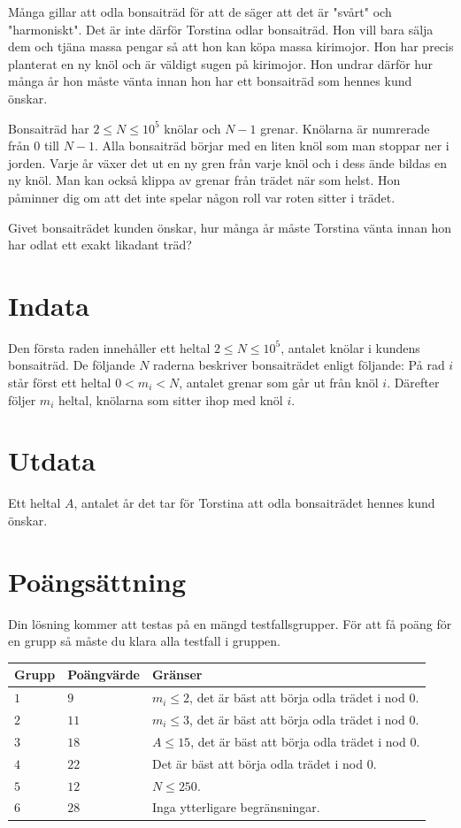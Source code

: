 Många gillar att odla bonsaiträd för att de säger att det är "svårt" och "harmoniskt". Det är inte därför Torstina odlar bonsaiträd. Hon vill bara sälja dem och tjäna massa pengar så att hon kan köpa massa kirimojor. Hon har precis planterat en ny knöl och är väldigt sugen på kirimojor. Hon undrar därför hur många år hon måste vänta innan hon har ett bonsaiträd som hennes kund önskar.

Bonsaiträd har $2\leq N \leq 10^5$ knölar och $N-1$ grenar. Knölarna är numrerade från 0 till $N-1$. Alla bonsaiträd börjar med en liten knöl som man stoppar ner i jorden. Varje år växer det ut en ny gren från varje knöl och i dess ände bildas en ny knöl. Man kan också klippa av grenar från trädet när som helst. Hon påminner dig om att det inte spelar någon roll var roten sitter i trädet. 

Givet bonsaiträdet kunden önskar, hur många år måste Torstina vänta innan hon har odlat ett exakt likadant träd?

\section*{Indata}
Den första raden innehåller ett heltal $2 \leq N \leq 10^5$, antalet knölar i kundens bonsaiträd.
De följande $N$ raderna beskriver bonsaiträdet enligt följande:
På rad $i$ står först ett heltal $0 < m_i < N$, antalet grenar som går ut från knöl $i$. Därefter följer $m_i$ heltal, knölarna som sitter ihop med knöl $i$. 

\section*{Utdata}
Ett heltal $A$, antalet år det tar för Torstina att odla bonsaiträdet hennes kund önskar.

\section*{Poängsättning}
Din lösning kommer att testas på en mängd testfallsgrupper.
För att få poäng för en grupp så måste du klara alla testfall i gruppen.

\noindent
\begin{tabular}{| l | l | p{12cm} |}
  \hline
  Grupp & Poängvärde & Gränser \\ \hline
  $1$   & $9$        & $m_i\leq 2$, det är bäst att börja odla trädet i nod 0. \\ \hline
  $2$   & $11$       & $m_i \leq 3$, det är bäst att börja odla trädet i nod 0. \\ \hline
  $3$   & $18$       & $A \leq 15$, det är bäst att börja odla trädet i nod 0. \\ \hline
  $4$   & $22$       & Det är bäst att börja odla trädet i nod 0. \\ \hline
  $5$   & $12$       & $N \leq 250$. \\ \hline
  $6$   & $28$       & Inga ytterligare begränsningar. \\ \hline
\end{tabular}


